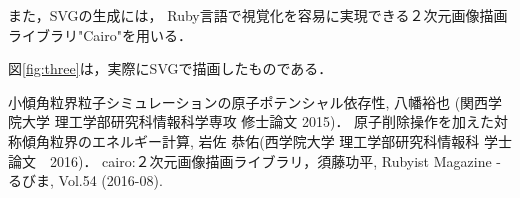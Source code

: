 \documentclass[a4j,twocolumn]{jsarticle}
\begin{document}
また，SVGの生成には，
Ruby言語で視覚化を容易に実現できる２次元画像描画ライブラリ"Cairo"を用いる\cite{sudoh}．

図\ref{fig:three}は，実際にSVGで描画したものである．



\begin{thebibliography}{9}
 小傾角粒界粒子シミュレーションの原子ポテンシャル依存性, 八幡裕也 (関西学院大学 理工学部研究科情報科学専攻 修士論文 2015)．
 原子削除操作を加えた対称傾角粒界のエネルギー計算, 岩佐 恭佑(西学院大学 理工学部研究科情報科 学士論文　2016)． 
 cairo:２次元画像描画ライブラリ，須藤功平, Rubyist Magazine - るびま, Vol.54 (2016-08).
\end{thebibliography}
\end{document}
